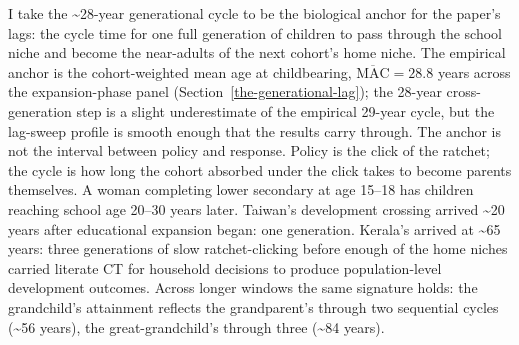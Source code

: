 \documentclass[12pt,letterpaper]{article}
\begin{document}
I take the \textasciitilde 28-year generational cycle to be the
biological anchor for the paper's lags: the cycle time for one
full generation of children to pass through the school niche and
become the near-adults of the next cohort's home niche. The
empirical anchor is the cohort-weighted mean age at childbearing,
$\overline{\mathrm{MAC}} = 28.8$ years across the expansion-phase
panel (Section~\ref{the-generational-lag}); the 28-year cross-generation
step is a slight underestimate of the empirical 29-year
cycle, but the lag-sweep profile is smooth enough that the
results carry through. The anchor is not the interval
between policy and response. Policy is the click of the ratchet;
the cycle is how long the cohort absorbed under the click takes to
become parents themselves. A woman completing lower secondary at
age 15--18 has children reaching school age 20--30 years later.
Taiwan's development crossing arrived \textasciitilde 20 years
after educational expansion began: one generation. Kerala's arrived
at \textasciitilde 65 years: three generations of slow
ratchet-clicking before enough of the home niches carried literate
CT for household decisions to produce population-level development
outcomes. Across longer windows the same signature holds: the
grandchild's attainment reflects the grandparent's through two
sequential cycles (\textasciitilde 56 years), the great-grandchild's
through three (\textasciitilde 84 years).
\end{document}
